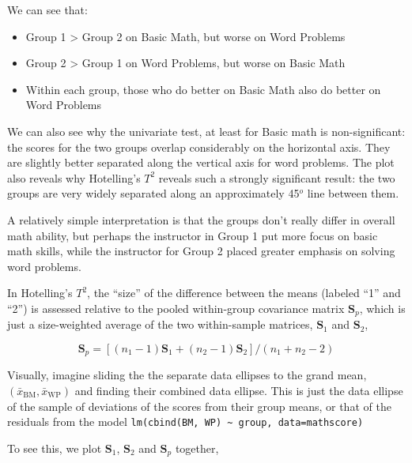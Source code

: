 \documentclass[
  letterpaper,
  10pt,
  krantz2]{krantz}
\providecommand{\tightlist}{%
  \setlength{\itemsep}{0pt}\setlength{\parskip}{0pt}}\usepackage{longtable,booktabs,array}
\begin{document}
We can see that:

\begin{itemize}
\tightlist
\item
  Group 1 \textgreater{} Group 2 on Basic Math, but worse on Word
  Problems
\item
  Group 2 \textgreater{} Group 1 on Word Problems, but worse on Basic
  Math
\item
  Within each group, those who do better on Basic Math also do better on
  Word Problems
\end{itemize}

We can also see why the univariate test, at least for Basic math is
non-significant: the scores for the two groups overlap considerably on
the horizontal axis. They are slightly better separated along the
vertical axis for word problems. The plot also reveals why Hotelling's
\(T^2\) reveals such a strongly significant result: the two groups are
very widely separated along an approximately 45\(^o\) line between them.

A relatively simple interpretation is that the groups don't really
differ in overall math ability, but perhaps the instructor in Group 1
put more focus on basic math skills, while the instructor for Group 2
placed greater emphasis on solving word problems.

In Hotelling's \(T^2\), the ``size'' of the difference between the means
(labeled ``1'' and ``2'') is assessed relative to the pooled
within-group covariance matrix \(\mathbf{S}_p\), which is just a
size-weighted average of the two within-sample matrices,
\(\mathbf{S}_1\) and \(\mathbf{S}_2\),

\[
\mathbf{S}_p = [ (n_1 - 1) \mathbf{S}_1 + (n_2 - 1) \mathbf{S}_2 ] / (n_1 + n_2 - 2)
\]

Visually, imagine sliding the the separate data ellipses to the grand
mean, \((\bar{x}_{\text{BM}}, \bar{x}_{\text{WP}})\) and finding their
combined data ellipse. This is just the data ellipse of the sample of
deviations of the scores from their group means, or that of the
residuals from the model
\texttt{lm(cbind(BM,\ WP)\ \textasciitilde{}\ group,\ data=mathscore)}

To see this, we plot \(\mathbf{S}_1\), \(\mathbf{S}_2\) and
\(\mathbf{S}_p\) together,
\end{document}
